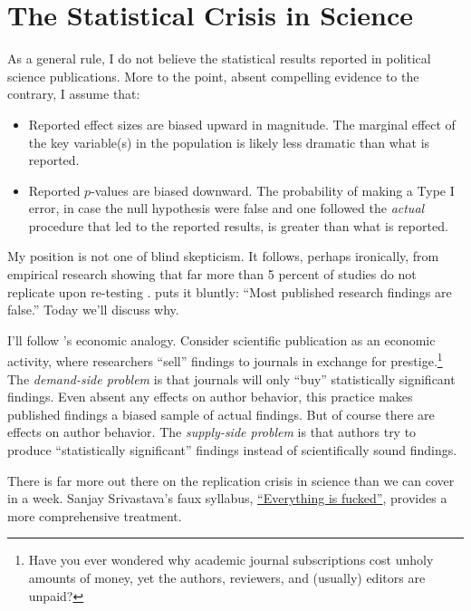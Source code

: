 \documentclass[12pt,oneside,openany]{book}
\let\rmarkdownfootnote\footnote%
\def\footnote{\protect\rmarkdownfootnote}
\begin{document}
\chapter{The Statistical Crisis in Science}\label{crisis}

As a general rule, I do not believe the statistical results reported in
political science publications. More to the point, absent compelling
evidence to the contrary, I assume that:

\begin{itemize}
\item
  Reported effect sizes are biased upward in magnitude. The marginal
  effect of the key variable(s) in the population is likely less
  dramatic than what is reported.
\item
  Reported \(p\)-values are biased downward. The probability of making a
  Type I error, in case the null hypothesis were false and one followed
  the \emph{actual} procedure that led to the reported results, is
  greater than what is reported.
\end{itemize}

My position is not one of blind skepticism. It follows, perhaps
ironically, from empirical research showing that far more than 5 percent
of studies do not replicate upon re-testing \citep{open2015estimating}.
\citet{ioannidis2005most} puts it bluntly: ``Most published research
findings are false.'' Today we'll discuss why.

I'll follow \citet{young2008current}'s economic analogy. Consider
scientific publication as an economic activity, where researchers
``sell'' findings to journals in exchange for prestige.\footnote{Have
  you ever wondered why academic journal subscriptions cost unholy
  amounts of money, yet the authors, reviewers, and (usually) editors
  are unpaid?} The \emph{demand-side problem} is that journals will only
``buy'' statistically significant findings. Even absent any effects on
author behavior, this practice makes published findings a biased sample
of actual findings. But of course there are effects on author behavior.
The \emph{supply-side problem} is that authors try to produce
``statistically significant'' findings instead of scientifically sound
findings.

There is far more out there on the replication crisis in science than we
can cover in a week. Sanjay Srivastava's faux syllabus,
\href{https://hardsci.wordpress.com/2016/08/11/everything-is-fucked-the-syllabus/}{``Everything
is fucked''}, provides a more comprehensive treatment.
\end{document}
